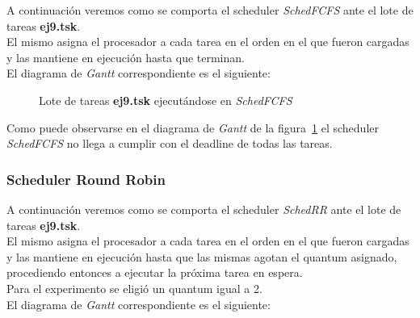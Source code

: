 A continuación veremos como se comporta el scheduler \textit{SchedFCFS} ante el lote de tareas \textbf{ej9.tsk}.\\ 
El mismo asigna el procesador a cada tarea en el orden en el que fueron cargadas y las mantiene en ejecución hasta que terminan.\\
El diagrama de \textit{Gantt} correspondiente es el siguiente:

\begin{figure}[H]
\centering
{}%
\caption{Lote de tareas \textbf{ej9.tsk} ejecutándose en \textit{SchedFCFS}}
\label{ej9-fcfs-gantt}
\end{figure}

Como puede observarse en el diagrama de \textit{Gantt} de la figura~\ref{ej9-fcfs-gantt} el scheduler \textit{SchedFCFS} no llega a cumplir con el deadline de todas las tareas.\\

\subsubsection{Scheduler Round Robin}

A continuación veremos como se comporta el scheduler \textit{SchedRR} ante el lote de tareas \textbf{ej9.tsk}.\\ 
El mismo asigna el procesador a cada tarea en el orden en el que fueron cargadas y las mantiene en ejecución hasta que las mismas agotan el quantum asignado, procediendo entonces a ejecutar la próxima tarea en espera.\\
Para el experimento se eligió un quantum igual a 2.\\
El diagrama de \textit{Gantt} correspondiente es el siguiente:

